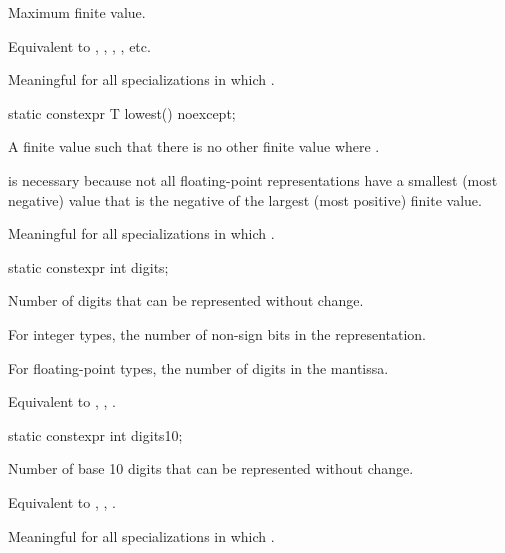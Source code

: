 \begin{itemdescr}
\pnum
Maximum finite value.
\begin{footnote}
Equivalent to , ,
, , etc.
\end{footnote}

\pnum
Meaningful for all specializations in which
.
\end{itemdescr}

%
\begin{itemdecl}
static constexpr T lowest() noexcept;
\end{itemdecl}

\begin{itemdescr}
\pnum
A finite value  such that there is no other finite
value  where .
\begin{footnote}
 is necessary because not all
floating-point representations have a smallest (most negative) value that is
the negative of the largest (most positive) finite value.
\end{footnote}

\pnum
Meaningful for all specializations in which .
\end{itemdescr}

%
\begin{itemdecl}
static constexpr int digits;
\end{itemdecl}

\begin{itemdescr}
\pnum
Number of
digits that can be represented without change.

\pnum
For integer types, the number of non-sign bits in the representation.

\pnum
For floating-point types, the number of  digits in the
mantissa.
\begin{footnote}
Equivalent to , ,
.
\end{footnote}
\end{itemdescr}

%
\begin{itemdecl}
static constexpr int digits10;
\end{itemdecl}

\begin{itemdescr}
\pnum
Number of base 10 digits that can be represented without
change.
\begin{footnote}
Equivalent to , ,
.
\end{footnote}

\pnum
Meaningful for all specializations in which
.
\end{itemdescr}

